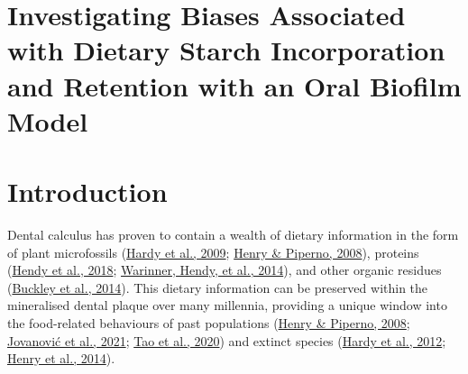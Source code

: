 \documentclass[
  letterpaper,
]{book}
\begin{document}

\hypertarget{investigating-biases-associated-with-dietary-starch-incorporation-and-retention-with-an-oral-biofilm-model}{%
\chapter{Investigating Biases Associated with Dietary Starch
Incorporation and Retention with an Oral Biofilm
Model}\label{investigating-biases-associated-with-dietary-starch-incorporation-and-retention-with-an-oral-biofilm-model}}


\hypertarget{byocstarch-intro}{%
\chapter{Introduction}\label{byocstarch-intro}}

Dental calculus has proven to contain a wealth of dietary information in
the form of plant microfossils
(\protect\hyperlink{ref-hardyStarchGranules2009}{Hardy et al., 2009};
\protect\hyperlink{ref-henryCalculusSyria2008}{Henry \& Piperno, 2008}),
proteins (\protect\hyperlink{ref-hendyProteomicCalculus2018}{Hendy et
al., 2018}; \protect\hyperlink{ref-warinnerEvidenceMilk2014}{Warinner,
Hendy, et al., 2014}), and other organic residues
(\protect\hyperlink{ref-buckleyDentalCalculus2014}{Buckley et al.,
2014}). This dietary information can be preserved within the mineralised
dental plaque over many millennia, providing a unique window into the
food-related behaviours of past populations
(\protect\hyperlink{ref-henryCalculusSyria2008}{Henry \& Piperno, 2008};
\protect\hyperlink{ref-jovanovicNeolithicCalculus2021}{Jovanović et al.,
2021}; \protect\hyperlink{ref-taoWheatCalculus2020}{Tao et al., 2020})
and extinct species
(\protect\hyperlink{ref-hardyNeanderthalMedics2012}{Hardy et al., 2012};
\protect\hyperlink{ref-henryNeanderthalCalculus2014}{Henry et al.,
2014}).
\end{document}
